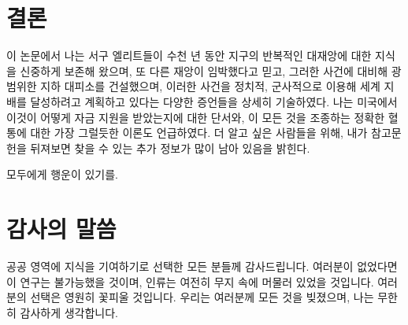 \documentclass[10pt,twocolumn,letterpaper]{article}
\begin{document}
\section{결론}

이 논문에서 나는 서구 엘리트들이 수천 년 동안 지구의 반복적인 대재앙에 대한 지식을 신중하게 보존해 왔으며, 또 다른 재앙이 임박했다고 믿고, 그러한 사건에 대비해 광범위한 지하 대피소를 건설했으며, 이러한 사건을 정치적, 군사적으로 이용해 세계 지배를 달성하려고 계획하고 있다는 다양한 증언들을 상세히 기술하였다. 나는 미국에서 이것이 어떻게 자금 지원을 받았는지에 대한 단서와, 이 모든 것을 조종하는 정확한 혈통에 대한 가장 그럴듯한 이론도 언급하였다. 더 알고 싶은 사람들을 위해, 내가 참고문헌을 뒤져보면 찾을 수 있는 추가 정보가 많이 남아 있음을 밝힌다.

모두에게 행운이 있기를.

\section{감사의 말씀}

공공 영역에 지식을 기여하기로 선택한 모든 분들께 감사드립니다. 여러분이 없었다면 이 연구는 불가능했을 것이며, 인류는 여전히 무지 속에 머물러 있었을 것입니다. 여러분의 선택은 영원히 꽃피울 것입니다. 우리는 여러분께 모든 것을 빚졌으며, 나는 무한히 감사하게 생각합니다.

\clearpage
\twocolumn

{\small
\renewcommand{\refname}{참고문헌}


}
\end{document}
